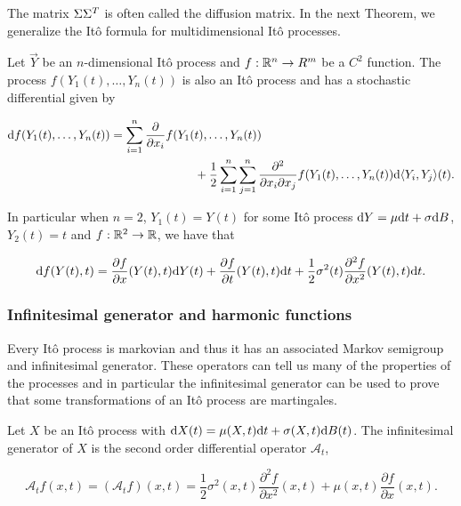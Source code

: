The matrix $\Sigma \Sigma^T$ is often called the diffusion matrix. In the next Theorem, we generalize the Itô formula for multidimensional Itô processes.

\begin{theorem}
    Let $\vec Y $ be an $n$-dimensional Itô process and $f: \mathbb R^n \to R^m$ be a $C^2$ function. The process $f(Y_1(t), \dots, Y_n(t))$ is also an Itô process and has a stochastic differential given by

    \begin{align*}
        \mathrm d f(Y_1(t), \dots, Y_n(t)) = \sum_{i=1}^n \frac{\partial}{\partial x_i} f(Y_1(&t), \dots, Y_n(t))\\  
        &+ \frac12 \sum_{i=1}^n \sum_{j=1}^n \frac{\partial^2}{\partial x_i\partial x_j} f(Y_1(t), \dots, Y_n(t)) \mathrm d \langle Y_i, Y_j\rangle (t).
    \end{align*}
\end{theorem}

In particular when $n=2$, $Y_1(t) = Y(t)$ for some Itô process $\mathrm d Y = \mu \mathrm d t + \sigma \mathrm d B$, $Y_2(t) = t$ and $f:\mathbb R^2 \to \mathbb R$, we have that

\begin{equation} \label{eq:ito_2var}
    \mathrm d f(Y(t),t) = \frac{\partial f}{\partial x} (Y(t),t) \mathrm d Y(t) + \frac{\partial f}{\partial t} (Y(t),t) \mathrm d t + \frac12 \sigma^2(t)\frac{\partial^2f}{\partial x^2} (Y(t),t) \mathrm d t.
\end{equation}


\subsubsection{Infinitesimal generator and harmonic functions}

Every Itô process is markovian and thus it has an associated Markov semigroup and infinitesimal generator. These operators can tell us many of the properties of the processes and in particular the infinitesimal generator can be used to prove that some transformations of an Itô process are martingales.

\begin{definition}
    Let $X$ be an Itô process with $\mathrm d X(t) = \mu(X,t) \mathrm d t + \sigma(X,t) \mathrm d B(t)$. The infinitesimal generator  of $X$ is the second order differential operator $\mathcal A_t$,

    \begin{equation*}
        \mathcal A_t f(x,t) = (\mathcal A_t f)(x,t) = \frac12 \sigma^2(x,t) \frac{\partial^2 f}{\partial x^2} (x,t) + \mu(x,t)\frac{\partial f}{\partial x}(x,t).
    \end{equation*}
\end{definition}

